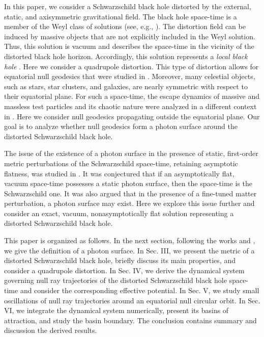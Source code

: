 \documentclass[twocolumn,showpacs,preprintnumbers,amsmath,amssymb,floatfix,nofootinbib]{revtex4-1}
\begin{document}
In this paper, we consider a Schwarzschild black hole distorted by the external, static, and axisymmetric gravitational field. The black hole space-time is a member of the Weyl class of solutions (see, e.g., \cite{Synge,Chandrasekhar}).  The distortion field can be induced by massive objects that are not explicitly included in the Weyl solution. 
Thus, this solution is vacuum and describes the space-time in the vicinity of the distorted black hole horizon. Accordingly, this solution represents a {\em local black hole} \cite{Geroch:1982bv}. Here we consider a quadrupole distortion. This type of distortion allows for equatorial null geodesics that were studied in \cite{Shoom:2015slu}. Moreover, many celestial objects, such as stars, star clusters, and galaxies, are nearly symmetric with respect to their equatorial plane. For such a space-time, the escape dynamics of massive and massless test particles and its chaotic nature were analyzed in a different context in \cite{deMoura:1999wf}. Here we consider null geodesics propagating outside the equatorial plane. Our goal is to analyze whether null geodesics form a photon surface around the distorted Schwarzschild black hole. 

The issue of the existence of a photon surface in the presence of static, first-order metric perturbations of the Schwarzschild space-time, retaining asymptotic flatness, was studied in \cite{Yoshino:2016kgi}. It was conjectured that if an asymptotically flat, vacuum space-time possesses a static photon surface, then the space-time is the Schwarzschild one. It was also argued that in the presence of a fine-tuned matter perturbation, a photon surface may exist. Here we explore this issue further and consider an exact, vacuum, nonasymptotically flat solution representing a distorted Schwarzschild black hole.     

This paper is organized as follows. In the next section, following the works \cite{Claudel:2000yi} and \cite{Gibbons:2016isj}, we give the definition of a photon surface. In Sec. III, we present the metric of a distorted Schwarzschild black hole, briefly discuss its main properties, and consider a quadrupole distortion. In Sec. IV, we derive the dynamical system governing null ray trajectories of the distorted Schwarzschild black hole space-time and consider the corresponding effective potential. In Sec. V, we study small oscillations of null ray trajectories around an equatorial null circular orbit. In Sec. VI, we integrate the dynamical system numerically, present its basins of attraction, and study the basin boundary. The conclusion contains summary and discussion the derived results. 
\end{document}
